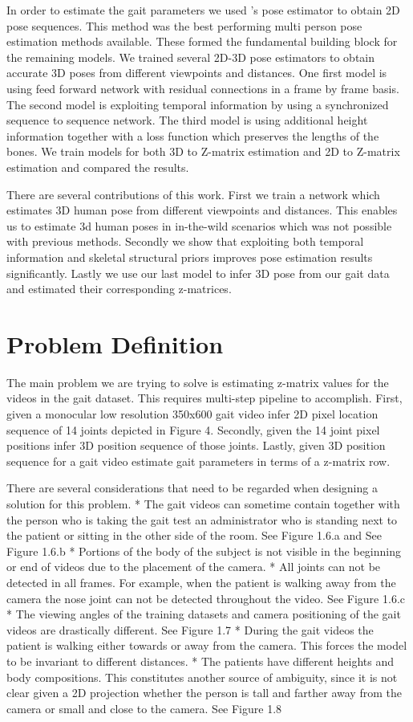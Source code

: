 In order to estimate the gait parameters we used \parencite{cao2016realtime}'s pose estimator to obtain 2D pose sequences. This method was the best performing multi person pose estimation methods available. These formed the fundamental building block for the remaining models. We trained several 2D-3D pose estimators to obtain accurate 3D poses from different viewpoints and distances. One first model is using feed forward network with residual connections in a frame by frame basis. The second model is exploiting temporal information by using a synchronized sequence to sequence network. The third model is using additional height information together with a loss function which preserves the lengths of the bones. We train models for both 3D to Z-matrix estimation and 2D to Z-matrix estimation and compared the results.

There are several contributions of this work. First we train a network which estimates 3D human pose from different viewpoints and distances. This enables us to estimate 3d human poses in in-the-wild  scenarios which was not possible with previous methods. Secondly we show that exploiting both  temporal information and skeletal structural priors improves pose estimation results significantly. Lastly we use our last model to infer 3D pose from our gait data and estimated their corresponding z-matrices.

\section{Problem Definition}

The main problem we are trying to solve is estimating z-matrix values for the videos in the gait dataset. This requires multi-step pipeline to accomplish. First, given a monocular low resolution 350x600 gait video infer 2D pixel location sequence of 14 joints depicted in Figure 4. Secondly, given the 14 joint pixel positions infer 3D position sequence of those joints. Lastly, given 3D position sequence for a gait video estimate gait parameters in terms of a z-matrix row.

There are several considerations that need to be regarded when designing a solution for this problem. 
* The gait videos can sometime contain together with the person who is taking the gait test an administrator who is standing next to the patient or sitting in the other side of the room. See Figure 1.6.a and See Figure 1.6.b
* Portions of the body of the subject is not visible in the beginning or end of videos due to the placement of the camera.
* All joints can not be detected in all frames. For example, when the patient is walking away from the camera the nose joint can not be detected throughout the video. See Figure 1.6.c
* The viewing angles of the training datasets and camera positioning of the gait videos are drastically different. See Figure 1.7
* During the gait videos the patient is walking either towards or away from the camera. This forces the model to be invariant to different distances. 
* The patients have different heights and body compositions. This constitutes another source of ambiguity, since it is not clear given a 2D projection whether the person is tall and farther away from the camera or small and close to the camera. See Figure 1.8

